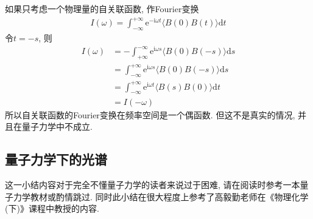     如果只考虑一个物理量的自关联函数, 作Fourier变换
    \begin{equation}\begin{aligned}
    I(\omega) = \int_{-\infty}^{+\infty} \mathrm{e}^{-\mathrm{i}\omega t} \langle B(0)B(t) \rangle \mathrm{d}t
    \end{aligned}\end{equation}
    令$t=-s$, 则
    \begin{equation}\begin{aligned}
    I(\omega) 
    &= -\int_{+\infty}^{-\infty} \mathrm{e}^{\mathrm{i}\omega s} \langle B(0)B(-s) \rangle \mathrm{d}s\\
    &= \int_{-\infty}^{+\infty} \mathrm{e}^{\mathrm{i}\omega s} \langle B(0)B(-s) \rangle \mathrm{d}s\\
    &= \int_{-\infty}^{+\infty} \mathrm{e}^{\mathrm{i}\omega t} \langle B(s)B(0) \rangle \mathrm{d}t\\
    &= I(-\omega)
    \end{aligned}\end{equation}
    所以自关联函数的Fourier变换在频率空间是一个偶函数. 但这不是真实的情况, 并且在量子力学中不成立.

    \subsection{量子力学下的光谱}

    这一小结内容对于完全不懂量子力学的读者来说过于困难, 请在阅读时参考一本量子力学教材或酌情跳过. 同时此小结在很大程度上参考了高毅勤老师在《物理化学(下)》课程中教授的内容.

